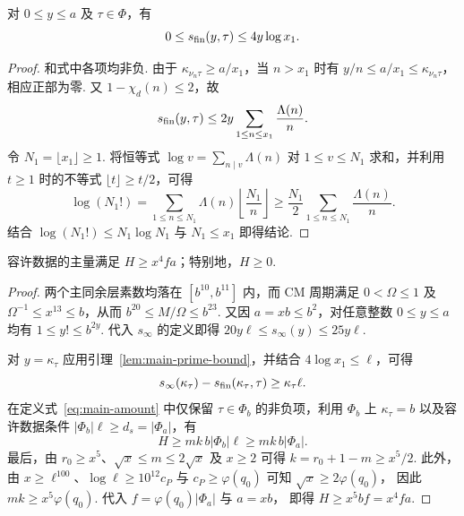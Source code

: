 \begin{lemma}[带权素数和的截断估计]
\label{lem:main-prime-bound}
\emitthmsource
对 $0\le y\le a$ 及 $\tau\in\Phi$，有
\[
 0\le s_{\rm fin}(y,\tau)\le 4y\log x_1 .
\]
\end{lemma}
\begin{proof}
和式中各项均非负. 由于 $\kappa_{\nu_n\tau}\ge a/x_1$，当 $n>x_1$ 时有
$y/n\le a/x_1\le\kappa_{\nu_n\tau}$，相应正部为零. 又 $1-\chi_d(n)\le2$，故
\[
 s_{\rm fin}(y,\tau)\le 2y\sum_{1\le n\le x_1}\frac{\Lambda(n)}{n}.
\]
令 $N_1=\lfloor x_1\rfloor\ge1$. 将恒等式 $\log v=\sum_{n\mid v}\Lambda(n)$ 对 $1\le v\le N_1$ 求和，并利用 $t\ge1$ 时的不等式 $\lfloor t\rfloor\ge t/2$，可得
\[
 \log(N_1!)=\sum_{1\le n\le N_1}\Lambda(n)\left\lfloor\frac{N_1}{n}\right\rfloor
 \ge\frac{N_1}{2}\sum_{1\le n\le N_1}\frac{\Lambda(n)}{n}.
\]
结合 $\log(N_1!)\le N_1\log N_1$ 与 $N_1\le x_1$ 即得结论.
\end{proof}

\begin{lemma}[主量的下界]
\label{lem:main-amount-lower}
\emitthmsource
容许数据的主量满足 $H\ge x^4fa$；特别地，$H\ge0$.
\end{lemma}
\begin{proof}
两个主同余层素数均落在 $[b^{10},b^{11}]$ 内，而 CM 周期满足 $0<\Omega\le1$ 及
$\Omega^{-1}\le x^{13}\le b$，从而 $b^{20}\le M/\Omega\le b^{23}$.
又因 $a=xb\le b^2$，对任意整数 $0\le y\le a$ 均有 $1\le y!\le b^{2y}$.
代入 $s_\infty$ 的定义即得 $20y\ell\le s_\infty(y)\le25y\ell$.

对 $y=\kappa_\tau$ 应用引理~\ref{lem:main-prime-bound}，并结合 $4\log x_1\le\ell$，可得
\[
 s_\infty(\kappa_\tau)-s_{\rm fin}(\kappa_\tau,\tau)\ge\kappa_\tau\ell .
\]
在定义式~\eqref{eq:main-amount} 中仅保留 $\tau\in\Phi_b$ 的非负项，利用 $\Phi_b$ 上 $\kappa_\tau=b$ 以及容许数据条件 $|\Phi_b|\ell\ge d_s=|\Phi_a|$，有
\[
 H\ge mk\, b|\Phi_b|\ell\ge mk\, b|\Phi_a|.
\]
最后，由 $r_0\ge x^5$、$\sqrt x\le m\le2\sqrt x$ 及 $x\ge2$ 可得
$k=r_0+1-m\ge x^5/2$.
此外，由 $x\ge\ell^{100}$、$\log\ell\ge10^{12}c_P$ 与 $c_P\ge\varphi(q_0)$ 可知 $\sqrt x\ge 2\varphi(q_0)$，
因此 $mk\ge x^5\varphi(q_0)$. 代入 $f=\varphi(q_0)|\Phi_a|$ 与 $a=xb$，
即得 $H\ge x^5 b f=x^4fa$.
\end{proof}

